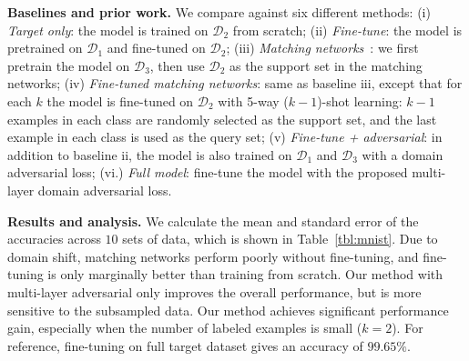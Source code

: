 \textbf{Baselines and prior work.} We compare against six different methods: (i) \textit{Target only}: the model is trained on $\mathcal{D}_{2}$ from scratch; (ii) \textit{Fine-tune}: the model is pretrained on $\mathcal{D}_{1}$ and fine-tuned on $\mathcal{D}_{2}$; (iii) \textit{Matching networks}~\cite{vinyals2016matching}: we first pretrain the model on $\mathcal{D}_{3}$, then use $\mathcal{D}_{2}$ as the support set in the matching networks; (iv) \textit{Fine-tuned matching networks}: same as baseline iii, except that for each $k$ the model is fine-tuned on $\mathcal{D}_{2}$ with 5-way ($k-1$)-shot learning: $k-1$ examples in each class are randomly selected as the support set, and the last example in each class is used as the query set; (v) \textit{Fine-tune + adversarial}: in addition to baseline ii, the model is also trained on $\mathcal{D}_{1}$ and $\mathcal{D}_{3}$ with a domain adversarial loss; (vi.) \textit{Full model}: fine-tune the model with the proposed multi-layer domain adversarial loss.

\textbf{Results and analysis.} We calculate the mean and standard error of the accuracies across $10$ sets of data, which is shown in Table~\ref{tbl:mnist}. Due to domain shift, matching networks perform poorly without fine-tuning, and fine-tuning is only marginally better than training from scratch. Our method with multi-layer adversarial only improves the overall performance, but is more sensitive to the subsampled data. Our method achieves significant performance gain, especially when the number of labeled examples is small ($k=2$). For reference, fine-tuning on full target dataset gives an accuracy of $99.65\%$. 

